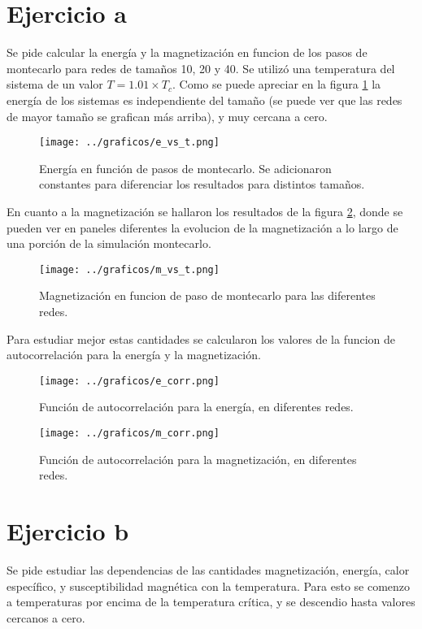 \documentclass[a4paper,10pt]{paper}
\begin{document}
\section{Ejercicio a}
Se pide calcular la energ\'ia y la magnetizaci\'on en funcion de los pasos de montecarlo para redes de tama\~nos
10, 20 y 40. Se utiliz\'o una temperatura del sistema de un valor $T = 1.01\times T_c$.
Como se puede apreciar en la figura \ref{fig:eja_e_vs_t} la energ\'ia de los sistemas es independiente
del tama\~no (se puede ver que las redes de mayor tama\~no se grafican m\'as arriba), y muy cercana a cero.
\begin{figure}
 \centering
 \texttt{[image: ../graficos/e\_vs\_t.png]}
 \caption{Energ\'ia en funci\'on de pasos de montecarlo. Se adicionaron constantes para diferenciar los resultados para distintos tama\~nos.}
 \label{fig:eja_e_vs_t}
\end{figure}

En cuanto a la magnetizaci\'on se hallaron los resultados de la figura \ref{fig:eja_m_vs_t}, donde se pueden ver en paneles diferentes
la evolucion de la magnetizaci\'on a lo largo de una porci\'on de la simulaci\'on montecarlo.

\begin{figure}
 \centering
 \texttt{[image: ../graficos/m\_vs\_t.png]}
 \caption{Magnetizaci\'on en funcion de paso de montecarlo para las diferentes redes.}
 \label{fig:eja_m_vs_t}
\end{figure}

Para estudiar mejor estas cantidades se calcularon los valores de la funcion de autocorrelaci\'on para la energ\'ia y la 
magnetizaci\'on.
\begin{figure}
 \centering
 \texttt{[image: ../graficos/e\_corr.png]}
 \caption{Funci\'on de autocorrelaci\'on para la energ\'ia, en diferentes redes.}
 \label{fig:e_corr}
\end{figure}

\begin{figure}
 \centering
 \texttt{[image: ../graficos/m\_corr.png]}
 \caption{Funci\'on de autocorrelaci\'on para la magnetizaci\'on, en diferentes redes.}
 \label{fig:e_corr}
\end{figure}

\section{Ejercicio b}
Se pide estudiar las dependencias de las cantidades magnetizaci\'on, energ\'ia, calor espec\'ifico, y
susceptibilidad magn\'etica con la temperatura. Para esto se comenzo a temperaturas por encima de la
temperatura cr\'itica, y se descendio hasta valores cercanos a cero.
\end{document}
